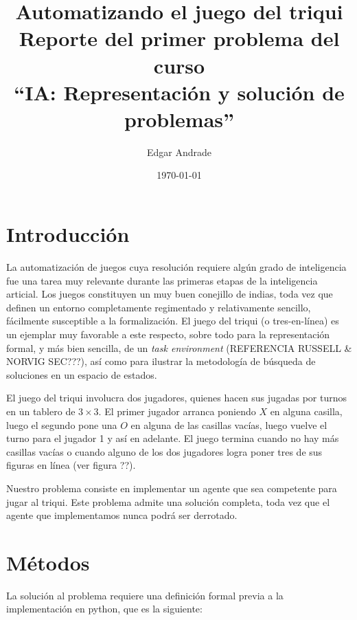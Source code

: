 \documentclass[11pt]{article}
\title{Automatizando el juego del triqui\\ Reporte del primer problema del curso\\ ``IA: Representación y solución de problemas''}
\author{Edgar Andrade}
\date{\today}
\begin{document}
\maketitle

\section{Introducción}

La automatización de juegos cuya resolución requiere algún grado de inteligencia fue una tarea muy relevante durante las primeras etapas de la inteligencia articial. Los juegos constituyen un muy buen conejillo de indias, toda vez que definen un entorno completamente regimentado y relativamente sencillo, fácilmente susceptible a la formalización. El juego del triqui (o tres-en-línea) es un ejemplar muy favorable a este respecto, sobre todo para la representación formal, y más bien sencilla, de un \emph{task environment} (REFERENCIA RUSSELL \& NORVIG SEC???), así como para ilustrar la metodología de búsqueda de soluciones en un espacio de estados.

El juego del triqui involucra dos jugadores, quienes hacen sus jugadas por turnos en un tablero de $3\times 3$. El primer jugador arranca poniendo $X$ en alguna casilla, luego el segundo pone una $O$ en alguna de las casillas vacías, luego vuelve el turno para el jugador 1 y así en adelante. El juego termina cuando no hay más casillas vacías o cuando alguno de los dos jugadores logra poner tres de sus figuras en línea (ver figura ??).

Nuestro problema consiste en implementar un agente que sea competente para jugar al triqui. Este problema admite una solución completa, toda vez que el agente que implementamos nunca podrá ser derrotado. 

\section{Métodos}

La solución al problema requiere una definición formal previa a la implementación en python, que es la siguiente:
\end{document}
